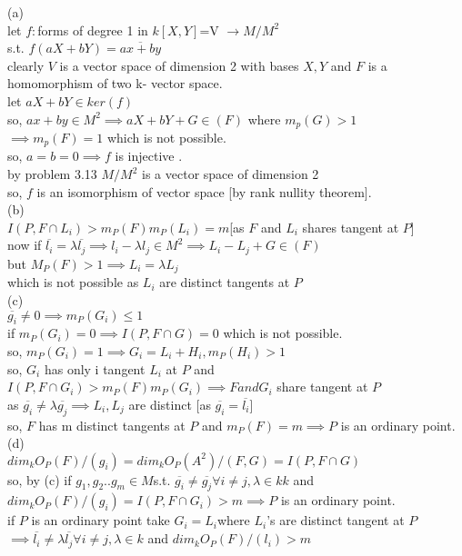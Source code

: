 \documentclass[11pt]{amsart}
\theoremstyle{definition}
\begin{document}
(a)\\
let $f:$forms of degree 1 in $k[X,Y]$=V $\to M/M^2$\\
s.t. $f(aX+bY)=\overline{ax+by}$\\
clearly $V$ is a vector space of dimension 2 with bases ${X,Y}$ and $F$ is a homomorphism of two k- vector space.\\
let $aX+bY\in ker(f)$\\
so, $ax+by\in M^2\implies aX+bY+G\in (F)$ where $m_p(G)>1$\\
$\implies m_p(F)=1$ which is not possible.\\
so, $a=b=0\implies f$ is injective .\\
by problem 3.13 $M/M^2$ is a vector space of dimension 2\\
so, $f$ is an isomorphism of vector space [by rank nullity theorem].\\
(b)\\
$I(P,F\cap L_i)>m_P(F)m_P(L_i)=m$[as $F$ and $L_i$ shares tangent at $P$]\\
now if $\overline{l_i}=\lambda \overline{l_j}\implies l_i-\lambda l_j\in M^2\implies L_i-L_j+G\in (F)$\\
but $M_P(F)>1\implies L_i=\lambda L_j$\\
which is not possible as $L_i$ are distinct tangents at $P$\\
(c)\\
$\overline{g_i}\neq 0\implies m_P(G_i)\leq 1$\\
if $m_P(G_i)=0\implies I(P,F\cap G)=0$ which is not possible.\\
so, $m_P(G_i)=1\implies G_i=L_i+H_i,m_P(H_i)>1$\\
so, $G_i$ has only i tangent $L_i$ at $P$ and $I(P,F\cap G_i)>m_P(F)m_P(G_i)\implies F and G_i$ share tangent at $P$\\
as $\overline{g_i}\neq \lambda \overline{g_j}\implies L_i, L_j$ are distinct [as $\overline{g_i}=\overline{l_i}$]\\
so, $F$ has m distinct tangents at $P$ and $m_P(F)=m\implies P$ is an ordinary point.\\
(d)\\
$dim_kO_P(F)/(g_i)=dim_kO_P(A^2)/(F,G)=I(P,F\cap G)$\\
so, by (c) if $g_1,g_2..g_m\in M$s.t. $\overline{g_i}\neq \overline{g_j}\forall i\neq j,\lambda \in k k$ and $dim_kO_P(F)/(g_i)=I(P,F\cap G_i)>m\implies P$ is an ordinary point.\\
if $P$ is an ordinary point take $G_i=L_i$where $L_i$'s are distinct tangent at $P$ $\implies\overline{l_i}\neq \lambda\overline{l_j}\forall i\neq j,\lambda\in k$ and $dim_kO_P(F)/(l_i)>m$\\
\end{document}
